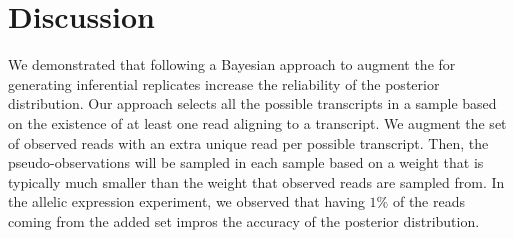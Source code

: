 \section{Discussion}

We demonstrated that following a Bayesian approach to augment the \boots for generating
inferential replicates increase the reliability of the posterior distribution.
Our approach selects all the possible transcripts in a sample based on the existence of at least
one read aligning to a transcript. We augment the set of observed
reads with an extra unique read per possible transcript. Then, the pseudo-observations will be
sampled in each \boot sample based on a weight that is typically much smaller than the weight that
observed reads are sampled from. 
In the allelic expression experiment, we observed that having $1\%$
of the reads coming from the added set impros the accuracy of the posterior distribution.


